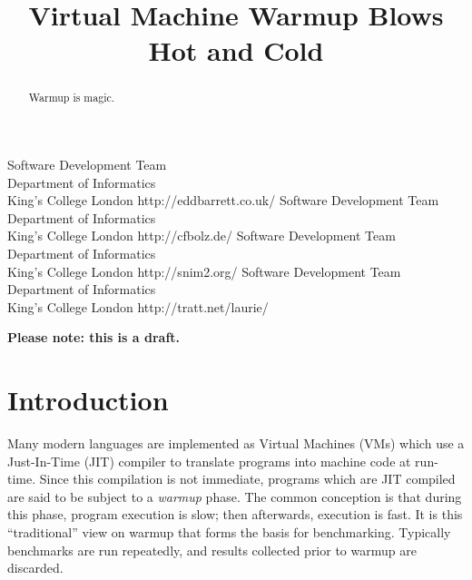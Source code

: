 \documentclass[10pt,preprint]{sigplanconf}
\begin{document}
\title{Virtual Machine Warmup Blows Hot and Cold}
           {Software Development Team\\ Department of Informatics\\ King's College London}
           {http://eddbarrett.co.uk/}
           {Software Development Team\\ Department of Informatics\\ King's College London}
           {http://cfbolz.de/}
           {Software Development Team\\ Department of Informatics\\ King's College London}
           {http://snim2.org/}
           {Software Development Team\\ Department of Informatics\\ King's College London}
           {http://tratt.net/laurie/}

\maketitle

\noindent\textbf{Please note: this is a draft.}

\begin{abstract}
Warmup is magic.
\end{abstract}

\section{Introduction}
\label{sec:intro}



Many modern languages are implemented as Virtual Machines (VMs) which use a
Just-In-Time (JIT) compiler to translate programs into machine code at run-time.
Since this compilation is not immediate, programs which are JIT compiled are
said to be subject to a \emph{warmup} phase. The common conception is that
during this phase, program execution is slow; then afterwards, execution is
fast. It is this ``traditional'' view on warmup that forms the basis for
benchmarking. Typically benchmarks are run repeatedly, and results collected
prior to warmup are discarded.
\end{document}
